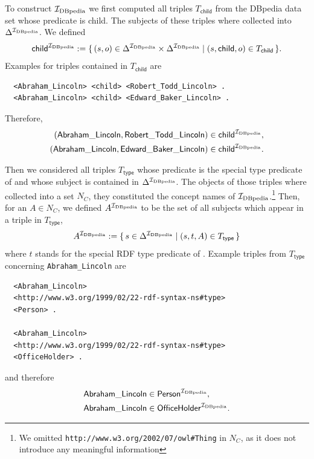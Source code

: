 To construct ${\mathcal{I}_{\text{DBpedia}}}$ we first computed all triples $T_{\mathsf{child}}$ from the
DBpedia data set whose predicate is \textsf{child}.  The subjects of these triples where
collected into $\Delta^{{\mathcal{I}_{\text{DBpedia}}}}$.  We defined
\begin{equation*}
  \mathsf{child}^{{\mathcal{I}_{\text{DBpedia}}}} := {\{\, (s, o) \in \Delta^{\mathcal{I}_{\text{DBpedia}}} \times \Delta^{\mathcal{I}_{\text{DBpedia}}}
    \mid (s, \mathsf{child}, o) \in T_{\mathsf{child}} \,\}}.
\end{equation*}
Examples for triples contained in $T_{\mathsf{child}}$ are
\begin{verbatim}
  <Abraham_Lincoln> <child> <Robert_Todd_Lincoln> .
  <Abraham_Lincoln> <child> <Edward_Baker_Lincoln> .
\end{verbatim}
Therefore,
\begin{align*}
  (\mathsf{Abraham\_Lincoln}, \mathsf{Robert\_Todd\_Lincoln}) &\in \mathsf{child}^{{\mathcal{I}_{\text{DBpedia}}}},\\
  (\mathsf{Abraham\_Lincoln}, \mathsf{Edward\_Baker\_Lincoln}) &\in \mathsf{child}^{{\mathcal{I}_{\text{DBpedia}}}}.
\end{align*}

Then we considered all triples $T_{\mathsf{type}}$ whose predicate is the special type
predicate of  and whose subject is contained in $\Delta^{{\mathcal{I}_{\text{DBpedia}}}}$.  The
objects of those triples where collected into a set $N_C$, \ie they constituted the
concept names of ${\mathcal{I}_{\text{DBpedia}}}$.\footnote{We omitted
  \texttt{http://www.w3.org/2002/07/owl\#Thing} in $N_C$, as it does not introduce any
  meaningful information} Then, for an $A \in N_C$, we defined $A^{{\mathcal{I}_{\text{DBpedia}}}}$ to be the
set of all subjects which appear in a triple in $T_{\mathsf{type}}$, \ie
\begin{equation*}
  A^{{\mathcal{I}_{\text{DBpedia}}}} := {\{\, s \in \Delta^{{\mathcal{I}_{\text{DBpedia}}}} \mid (s, t, A) \in
    T_{\mathsf{type}} \,\}}
\end{equation*}
where $t$ stands for the special RDF type predicate of .  Example triples from
$T_{\mathsf{type}}$ concerning \verb|Abraham_Lincoln| are
\begin{verbatim}
  <Abraham_Lincoln>
  <http://www.w3.org/1999/02/22-rdf-syntax-ns#type>
  <Person> .

  <Abraham_Lincoln>
  <http://www.w3.org/1999/02/22-rdf-syntax-ns#type>
  <OfficeHolder> .
\end{verbatim}
and therefore
\begin{align*}
  \mathsf{Abraham\_Lincoln} &\in \mathsf{Person}^{{\mathcal{I}_{\text{DBpedia}}}}, \\
  \mathsf{Abraham\_Lincoln} &\in \mathsf{OfficeHolder}^{{\mathcal{I}_{\text{DBpedia}}}}.
\end{align*}

